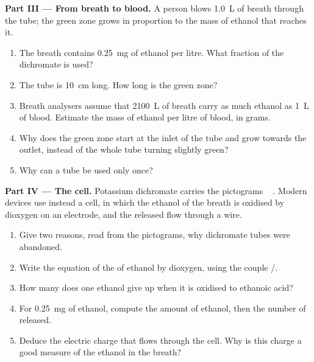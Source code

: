 \begin{problem}
\medskip
\noindent\textbf{Part III --- From breath to blood.}
A person blows \qty{1.0}{L} of breath through the tube; the green zone
grows in proportion to the mass of ethanol that reaches it.
\begin{enumerate}[resume]
  \item The breath contains \qty{0.25}{mg} of ethanol per litre. What
        fraction of the dichromate is used?
  \item The tube is \qty{10}{cm} long. How long is the green zone?
  \item Breath analysers assume that \qty{2100}{L} of breath carry as
        much ethanol as \qty{1}{L} of blood. Estimate the mass of ethanol
        per litre of blood, in grams.
  \item Why does the green zone start at the inlet of the tube and grow
        towards the outlet, instead of the whole tube turning slightly
        green?
  \item Why can a tube be used only once?
\end{enumerate}

\medskip
\noindent\textbf{Part IV --- The  cell.}
Potassium dichromate carries the pictograms
\,\,\,\,\,.
Modern devices use instead a  cell, in which the ethanol of the
breath is oxidised by dioxygen on an electrode, and the 
released flow through a wire.
\begin{enumerate}[resume]
  \item Give two reasons, read from the pictograms, why dichromate
        tubes were abandoned.
  \item Write the equation of the  of ethanol by dioxygen,
        using the couple /.
  \item How many  does one ethanol  give up when it is
        oxidised to ethanoic acid?
  \item For \qty{0.25}{mg} of ethanol, compute the amount of ethanol,
        then the number of  released.
  \item Deduce the electric charge that flows through the  cell.
        Why is this charge a good measure of the ethanol in the breath?
\end{enumerate}
\end{problem}
